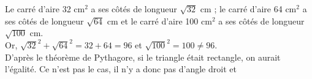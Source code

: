    Le carré d'aire 32 cm$^2$ a ses côtés de longueur $\sqrt{32}$ cm ; le carré d'aire 64 cm$^2$ a ses côtés de longueur $\sqrt{64}$ cm et le carré d'aire 100 cm$^2$ a ses côtés de longueur $\sqrt{100}$ cm. \\
Or, $\sqrt{32}^2+\sqrt{64}^2 =32+64 = 96$ et $\sqrt{100}^2 =100 \not=96$. \\
D'après le théorème de Pythagore, si le triangle était rectangle, on aurait l'égalité. Ce n'est pas le cas, il n'y a donc pas d'angle droit et  \\
